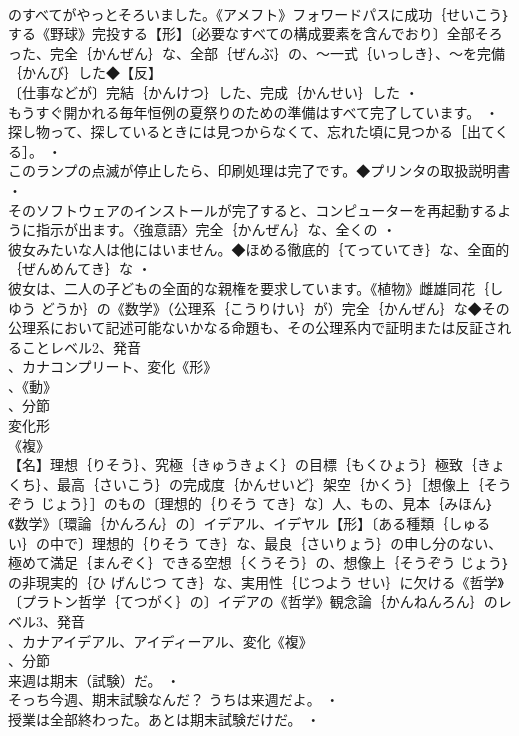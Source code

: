 \documentclass[8pt]{extreport}
\begin{document}
\begin{CJK}{UTF8}{min}
\\	のすべてがやっとそろいました。《アメフト》フォワードパスに成功｛せいこう｝する《野球》完投する【形】〔必要なすべての構成要素を含んでおり〕全部そろった、完全｛かんぜん｝な、全部｛ぜんぶ｝の、～一式｛いっしき｝、～を完備｛かんび｝した◆【反】
\\	〔仕事などが〕完結｛かんけつ｝した、完成｛かんせい｝した ・
\\	もうすぐ開かれる毎年恒例の夏祭りのための準備はすべて完了しています。 ・
\\	探し物って、探しているときには見つからなくて、忘れた頃に見つかる［出てくる］。 ・
\\	このランプの点滅が停止したら、印刷処理は完了です。◆プリンタの取扱説明書 ・
\\	そのソフトウェアのインストールが完了すると、コンピューターを再起動するように指示が出ます。〈強意語〉完全｛かんぜん｝な、全くの ・
\\	彼女みたいな人は他にはいません。◆ほめる徹底的｛てっていてき｝な、全面的｛ぜんめんてき｝な ・
\\	彼女は、二人の子どもの全面的な親権を要求しています。《植物》雌雄同花｛しゆう どうか｝の《数学》（公理系｛こうりけい｝が）完全｛かんぜん｝な◆その公理系において記述可能ないかなる命題も、その公理系内で証明または反証されることレベル2、発音
\\	、カナコンプリート、変化《形》
\\	、《動》
\\	、分節
\\	変化形 
\\	《複》
\\	【名】理想｛りそう｝、究極｛きゅうきょく｝の目標｛もくひょう｝極致｛きょくち｝、最高｛さいこう｝の完成度｛かんせいど｝架空｛かくう｝［想像上｛そうぞう じょう｝］のもの〔理想的｛りそう てき｝な〕人、もの、見本｛みほん｝《数学》〔環論｛かんろん｝の〕イデアル、イデヤル【形】〔ある種類｛しゅるい｝の中で〕理想的｛りそう てき｝な、最良｛さいりょう｝の申し分のない、極めて満足｛まんぞく｝できる空想｛くうそう｝の、想像上｛そうぞう じょう｝の非現実的｛ひ げんじつ てき｝な、実用性｛じつよう せい｝に欠ける《哲学》〔プラトン哲学｛てつがく｝の〕イデアの《哲学》観念論｛かんねんろん｝のレベル3、発音
\\	、カナアイデアル、アイディーアル、変化《複》
\\	、分節
\\	来週は期末（試験）だ。 ・
\\	そっち今週、期末試験なんだ？ うちは来週だよ。 ・
\\	授業は全部終わった。あとは期末試験だけだ。 ・

\end{CJK}
\end{document}
